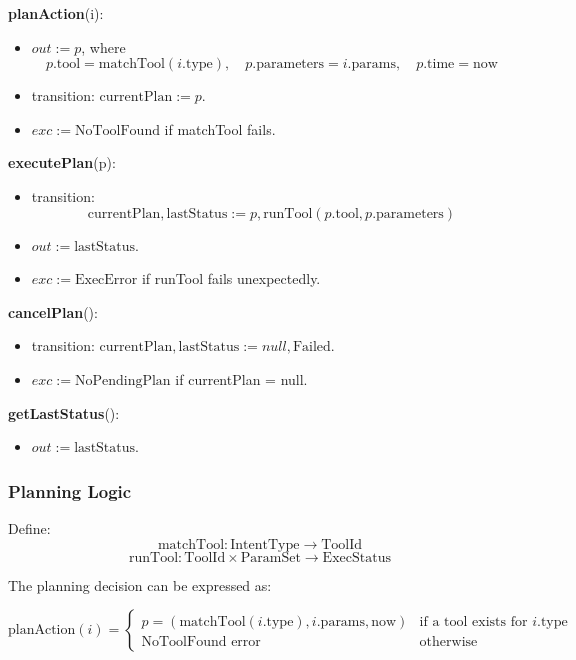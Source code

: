 \documentclass[12pt, titlepage]{article}
\begin{document}
\noindent
\textbf{planAction}(i):
\begin{itemize}
  \item $out := p$, where
  \[
    p.\text{tool} = \text{matchTool}(i.\text{type}), \quad
    p.\text{parameters} = i.\text{params}, \quad
    p.\text{time} = \text{now}
  \]
  \item transition: $\text{currentPlan} := p$.
  \item $exc := \text{NoToolFound}$ if matchTool fails.
\end{itemize}

\noindent
\textbf{executePlan}(p):
\begin{itemize}
  \item transition:
  \[
    \text{currentPlan}, \text{lastStatus}
    := p, \text{runTool}(p.\text{tool}, p.\text{parameters})
  \]
  \item $out := \text{lastStatus}$.
  \item $exc := \text{ExecError}$ if runTool fails unexpectedly.
\end{itemize}

\noindent
\textbf{cancelPlan}():
\begin{itemize}
  \item transition: $\text{currentPlan}, \text{lastStatus} := null, \text{Failed}$.
  \item $exc := \text{NoPendingPlan}$ if currentPlan = null.
\end{itemize}

\noindent
\textbf{getLastStatus}():
\begin{itemize}
  \item $out := \text{lastStatus}$.
\end{itemize}

\subsubsection{Planning Logic}

Define:
\[
  \text{matchTool} : \text{IntentType} \rightarrow \text{ToolId}
\]
\[
  \text{runTool} : \text{ToolId} \times \text{ParamSet} \rightarrow \text{ExecStatus}
\]

\noindent
The planning decision can be expressed as:

\[
  \text{planAction}(i) =
  \begin{cases}
    p = (\text{matchTool}(i.\text{type}), i.\text{params}, \text{now}) &
    \text{if a tool exists for } i.\text{type} \\
    \text{NoToolFound error} & \text{otherwise}
  \end{cases}
\]
\end{document}
